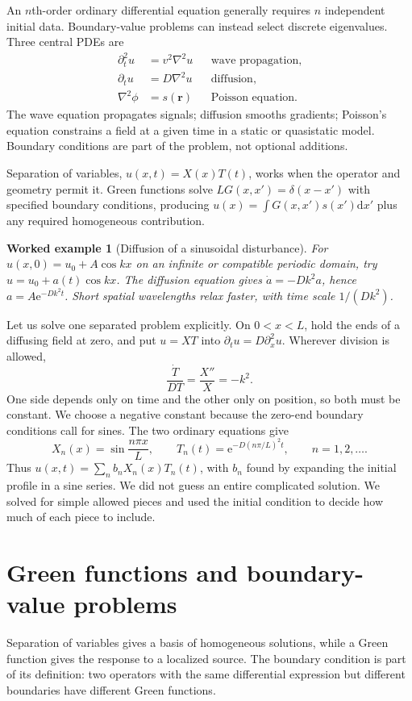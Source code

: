 \documentclass[11pt,oneside]{book}
\newcommand{\dd}{\mathrm{d}}
\newcommand{\ee}{\mathrm{e}}
\newcommand{\vect}[1]{\boldsymbol{#1}}
\newcommand{\lap}{\nabla^2}
\theoremstyle{reviewstyle}
\newtheorem{example}{Worked example}[chapter]
\begin{document}
An $n$th-order ordinary differential equation generally requires $n$ independent initial data. Boundary-value problems can instead select discrete eigenvalues. Three central PDEs are
\begin{align}
\partial_t^2u&=v^2\lap u &&\text{wave propagation},\\
\partial_tu&=D\lap u &&\text{diffusion},\\
\lap\phi&=s(\vect r) &&\text{Poisson equation}.
\end{align}
The wave equation propagates signals; diffusion smooths gradients; Poisson's equation constrains a field at a given time in a static or quasistatic model. Boundary conditions are part of the problem, not optional additions.

Separation of variables, $u(x,t)=X(x)T(t)$, works when the operator and geometry permit it. Green functions solve $LG(x,x')=\delta(x-x')$ with specified boundary conditions, producing
$u(x)=\int G(x,x')s(x')\dd x'$ plus any required homogeneous contribution.
\begin{example}[Diffusion of a sinusoidal disturbance]
For $u(x,0)=u_0+A\cos kx$ on an infinite or compatible periodic domain, try $u=u_0+a(t)\cos kx$. The diffusion equation gives $\dot a=-Dk^2a$, hence $a=A\ee^{-Dk^2t}$. Short spatial wavelengths relax faster, with time scale $1/(Dk^2)$.
\end{example}

Let us solve one separated problem explicitly. On $0<x<L$, hold the ends of a diffusing field at zero, and put $u=XT$ into $\partial_tu=D\partial_x^2u$. Wherever division is allowed,
\begin{equation}
\frac{\dot T}{DT}=\frac{X''}{X}=-k^2.
\end{equation}
One side depends only on time and the other only on position, so both must be constant. We choose a negative constant because the zero-end boundary conditions call for sines. The two ordinary equations give
\begin{equation}
X_n(x)=\sin\frac{n\pi x}{L},\qquad
T_n(t)=\ee^{-D(n\pi/L)^2t},\qquad n=1,2,\ldots.
\end{equation}
Thus $u(x,t)=\sum_n b_nX_n(x)T_n(t)$, with $b_n$ found by expanding the initial profile in a sine series. We did not guess an entire complicated solution. We solved for simple allowed pieces and used the initial condition to decide how much of each piece to include.

\section{Green functions and boundary-value problems}
Separation of variables gives a basis of homogeneous solutions, while a Green function gives the response to a localized source. The boundary condition is part of its definition: two operators with the same differential expression but different boundaries have different Green functions.
\end{document}
